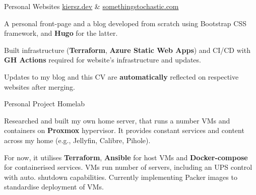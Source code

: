 \begin{cventries}


   \cventry
   	{Personal Websites}
  	{\href{https://kiersz.dev/}{kiersz.dev} \& \href{https://somethingstochastic.com/}{somethingstochastic.com}}
    {} %
    {} %
   	{
   	   	\begin{cvitems} 
   	    \item A personal front-page and a blog developed from scratch using Bootstrap CSS framework, and \textbf{Hugo} for the latter.
   	    \item Built infrastructure (\textbf{Terraform}, \textbf{Azure Static Web Apps}) and CI/CD with \textbf{GH Actions} required for website's infrastructure and updates. 
   	    \item Updates to my blog and this CV are \textbf{automatically} reflected on respective websites after merging.
   	    \end{cvitems}
   	}
   	
   	

  \cventry
   	{Personal Project}
    {Homelab}
    {} %
    {} %
    {
     \begin{cvitems} 
     	\item Researched and built my own home server, that runs a number VMs and containers on \textbf{Proxmox} hypervisor. It provides constant services and content across my home (e.g., Jellyfin, Calibre, Pihole). 
     	\item For now, it utilises \textbf{Terraform}, \textbf{Ansible} for host VMs and \textbf{Docker-compose} for containerised services. VMs run number of servers, including an UPS control with auto. shutdown capabilities. Currently implementing Packer images to standardise deployment of VMs.
     \end{cvitems}
     }
     


\end{cventries}
